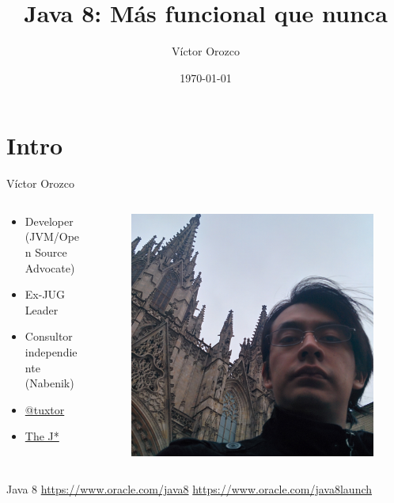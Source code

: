 \documentclass{beamer}
\title{Java 8: Más funcional que nunca}
\author{Víctor Orozco}
\institute{Nabenik}
\date{\today}
\begin{document}
\frame{\titlepage}

\section{Intro}


\begin{frame}{Víctor Orozco}
     \begin{columns}[T] %
	     \begin{column}[T]{5cm} %
				\begin{itemize}
				\item Developer (JVM/Open Source Advocate)
				\item Ex-JUG Leader
				\item Consultor independiente (Nabenik)
				\item \href{https://twitter.com/tuxtor}{@tuxtor}
				\item \href{http://vorozco.com}{The J*} 
				\end{itemize}
	     \end{column}
	     \begin{column}[T]{5cm} %
			\begin{figure}
			\centering
			\includegraphics[width=0.7\linewidth]{Images/barcelona.jpg}
			\end{figure}

	     \end{column}
     \end{columns}
\end{frame}


\begin{frame}{Java 8}
\href{https://www.oracle.com/java8}{https://www.oracle.com/java8}
\href{https://www.oracle.com/java8launch}{https://www.oracle.com/java8launch}
\end{frame}
\end{document}
